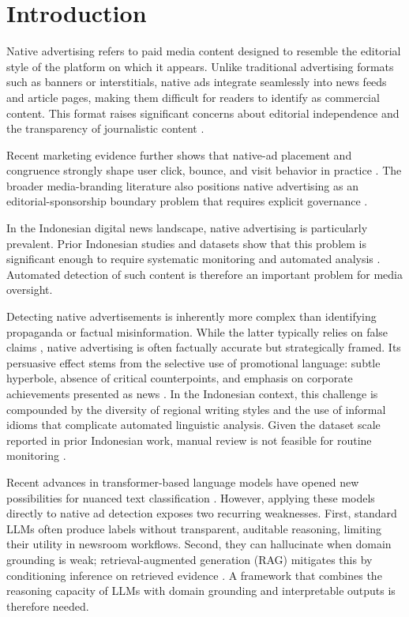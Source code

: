 \documentclass{ieeeaccess}
\begin{document}
\titlepgskip=-15pt

\maketitle

\section{Introduction}
\label{sec:introduction}
Native advertising refers to paid media content designed to resemble the editorial style of the platform on which it appears. Unlike traditional advertising formats such as banners or interstitials, native ads integrate seamlessly into news feeds and article pages, making them difficult for readers to identify as commercial content. This format raises significant concerns about editorial independence and the transparency of journalistic content \cite{b38}.

Recent marketing evidence further shows that native-ad placement and congruence strongly shape user click, bounce, and visit behavior in practice \cite{b53}. The broader media-branding literature also positions native advertising as an editorial-sponsorship boundary problem that requires explicit governance \cite{b54}.

In the Indonesian digital news landscape, native advertising is particularly prevalent. Prior Indonesian studies and datasets show that this problem is significant enough to require systematic monitoring and automated analysis \cite{b17, b21}. Automated detection of such content is therefore an important problem for media oversight.

Detecting native advertisements is inherently more complex than identifying propaganda or factual misinformation. While the latter typically relies on false claims \cite{b8}, native advertising is often factually accurate but strategically framed. Its persuasive effect stems from the selective use of promotional language: subtle hyperbole, absence of critical counterpoints, and emphasis on corporate achievements presented as news \cite{b9}. In the Indonesian context, this challenge is compounded by the diversity of regional writing styles and the use of informal idioms that complicate automated linguistic analysis. Given the dataset scale reported in prior Indonesian work, manual review is not feasible for routine monitoring \cite{b17, b19}.

Recent advances in transformer-based language models have opened new possibilities for nuanced text classification \cite{b23, b39}. However, applying these models directly to native ad detection exposes two recurring weaknesses. First, standard LLMs often produce labels without transparent, auditable reasoning, limiting their utility in newsroom workflows. Second, they can hallucinate when domain grounding is weak; retrieval-augmented generation (RAG) mitigates this by conditioning inference on retrieved evidence \cite{b25}. A framework that combines the reasoning capacity of LLMs with domain grounding and interpretable outputs is therefore needed.
\end{document}
